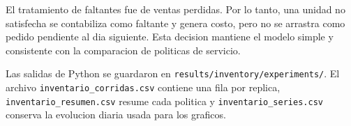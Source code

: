 El tratamiento de faltantes fue de ventas perdidas. Por lo tanto, una unidad no satisfecha se contabiliza como faltante y genera costo, pero no se arrastra como pedido pendiente al dia siguiente. Esta decision mantiene el modelo simple y consistente con la comparacion de politicas de servicio.

Las salidas de Python se guardaron en \texttt{results/inventory/experiments/}. El archivo \texttt{inventario\_corridas.csv} contiene una fila por replica, \texttt{inventario\_resumen.csv} resume cada politica y \texttt{inventario\_series.csv} conserva la evolucion diaria usada para los graficos.

